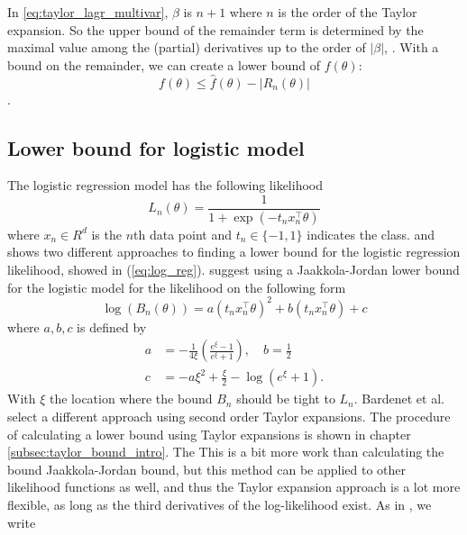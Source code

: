 In \eqref{eq:taylor_lagr_multivar}, $\beta$ is $n+1$ where $n$ is the order of the Taylor expansion. So the upper bound of the remainder term is determined by the maximal value among the (partial) derivatives up to the order of $\left| \beta\right|$, .  
With a bound on the remainder, we can create a lower bound of $f\left(\theta\right)$: 
\begin{equation}\label{eq:lower_bound}
    f\left(\theta\right) \leq \hat{f}\left(\theta\right) - \left|R_n\left(\theta\right)\right|
\end{equation}. 


\subsection{Lower bound for logistic model}
The logistic regression model has the following likelihood 
\begin{equation}\label{eq:log_reg}
    L_n\left(\theta\right) = \frac{1}{1 + \exp\left(-t_n x_n^{\top}\theta \right)} 
\end{equation}
where $x_n \in R^d$ is the $n$th data point and $t_n\in \{-1, 1\}$ indicates the class. 
\cite{Maclaurin:1} and \cite{Bardenet:1} shows two different approaches to finding a lower bound for the logistic regression likelihood, showed in (\ref{eq:log_reg}). 
\cite{Maclaurin:1} suggest using a Jaakkola-Jordan lower bound for the logistic model for the likelihood on the following form 
\begin{equation}\label{eq:Jakkola_bound}
    \log\left(B_n\left(\theta\right)\right) = a\left(t_n x_n^{\top} \theta\right)^2 + b\left(t_n x_n ^{\top}\theta \right) + c
\end{equation}
where $a,b,c$ is defined by
\begin{equation}
\begin{split}
    a &= -\frac{1}{4\xi}\left(\frac{e^{\xi} - 1}{e^{\xi} + 1}\right), \quad b = \frac{1}{2} \\
    c &= -a\xi^2 + \frac{\xi}{2} - \log\left(e^{\xi} + 1\right). 
\end{split}
\end{equation}
With $\xi$ the location where the bound $B_n$ should be tight to $L_n$. 
Bardenet et al. select a different approach using second order Taylor expansions. The procedure of calculating a lower bound using Taylor expansions is shown in chapter \ref{subsec:taylor_bound_intro}. 
The 
This is a bit more work than calculating the bound Jaakkola-Jordan bound, but this method can be applied to other likelihood functions as well, and thus the Taylor expansion approach is a lot more flexible, as long as the third derivatives of the log-likelihood exist. As in \cite{Bardenet:1}, we write
